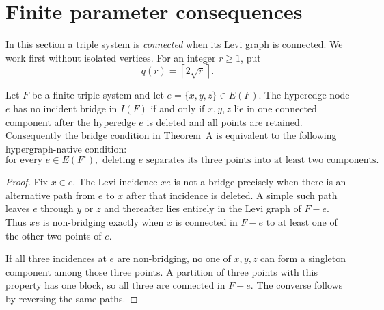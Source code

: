 \section{Finite parameter consequences}\label{finite-parameter-consequences}

In this section a triple system is \emph{connected} when its Levi graph is
connected.  We work first without isolated vertices.  For an integer $r\ge1$,
put
\[
q(r)=\left\lceil2\sqrt r\right\rceil.
\]

\begin{proposition}
\label{proposition-edge-deletion-bridge-condition}
Let $F$ be a finite triple system and let $e=\{x,y,z\}\in E(F)$.  The
hyperedge-node $e$ has no incident bridge in $I(F)$ if and only if $x,y,z$
lie in one connected component after the hyperedge $e$ is deleted and all
points are retained.  Consequently the bridge condition in Theorem~A is
equivalent to the following hypergraph-native condition:
\[
\text{for every }e\in E(F^\circ),\text{ deleting }e\text{ separates its
three points into at least two components.}
\]
\end{proposition}
\begin{proof}
Fix $x\in e$.  The Levi incidence $xe$ is not a bridge precisely when there
is an alternative path from $e$ to $x$ after that incidence is deleted.  A
simple such path leaves $e$ through $y$ or $z$ and thereafter lies entirely
in the Levi graph of $F-e$.  Thus $xe$ is non-bridging exactly when $x$ is
connected in $F-e$ to at least one of the other two points of $e$.

If all three incidences at $e$ are non-bridging, no one of $x,y,z$ can form a
singleton component among those three points.  A partition of three points
with this property has one block, so all three are connected in $F-e$.  The
converse follows by reversing the same paths.
\end{proof}

